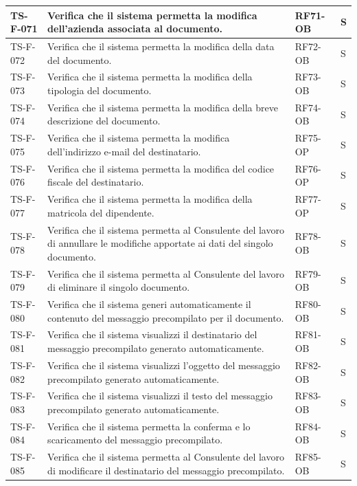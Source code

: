 \documentclass[a4paper,12pt]{article}
\begin{document}
\begin{longtable}{|p{2.2cm}|p{9.5cm}|p{2.3cm}|p{1.5cm}|}
    \hline
    TS-F-071 & Verifica che il sistema permetta la modifica dell'azienda associata al documento. & RF71-OB & S \\
    \hline
    TS-F-072 & Verifica che il sistema permetta la modifica della data del documento. & RF72-OB & S \\
    \hline
    TS-F-073 & Verifica che il sistema permetta la modifica della tipologia del documento. & RF73-OB & S \\
    \hline
    TS-F-074 & Verifica che il sistema permetta la modifica della breve descrizione del documento. & RF74-OB & S \\
    \hline
    TS-F-075 & Verifica che il sistema permetta la modifica dell'indirizzo e-mail del destinatario. & RF75-OP & S \\
    \hline
    TS-F-076 & Verifica che il sistema permetta la modifica del codice fiscale del destinatario. & RF76-OP & S \\
    \hline
    TS-F-077 & Verifica che il sistema permetta la modifica della matricola del dipendente. & RF77-OP & S \\
    \hline
    TS-F-078 & Verifica che il sistema permetta al Consulente del lavoro di annullare le modifiche apportate ai dati del singolo documento. & RF78-OB & S \\
    \hline
    TS-F-079 & Verifica che il sistema permetta al Consulente del lavoro di eliminare il singolo documento. & RF79-OB & S \\
    \hline
    TS-F-080 & Verifica che il sistema generi automaticamente il contenuto del messaggio precompilato per il documento. & RF80-OB & S \\
    \hline
    TS-F-081 & Verifica che il sistema visualizzi il destinatario del messaggio precompilato generato automaticamente. & RF81-OB & S \\
    \hline
    TS-F-082 & Verifica che il sistema visualizzi l'oggetto del messaggio precompilato generato automaticamente. & RF82-OB & S \\
    \hline
    TS-F-083 & Verifica che il sistema visualizzi il testo del messaggio precompilato generato automaticamente. & RF83-OB & S \\
    \hline
    TS-F-084 & Verifica che il sistema permetta la conferma e lo scaricamento del messaggio precompilato. & RF84-OB & S \\
    \hline
    TS-F-085 & Verifica che il sistema permetta al Consulente del lavoro di modificare il destinatario del messaggio precompilato. & RF85-OB & S \\

\end{longtable}
\end{document}
